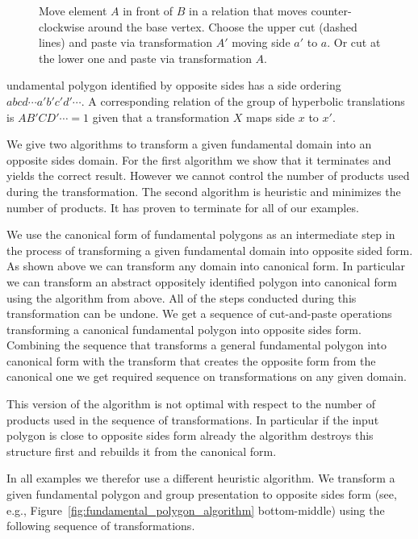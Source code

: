 \documentclass[Thesis]{subfiles}
\begin{document}
\begin{figure}
\centering
\resizebox{0.3\textwidth}{!} {

}
\caption{Move element $A$ in front of $B$ in a relation that moves counter-clockwise around the base vertex. Choose the upper cut (dashed lines) and paste via transformation $A'$ moving side $a'$ to $a$. Or cut at the lower one and paste via transformation $A$.}
\label{fig:cut-and-paste-motion}
\end{figure}

undamental polygon identified by opposite sides has a side ordering $abcd\cdots a'b'c'd'\cdots$. A corresponding relation of the group of hyperbolic translations is $AB'CD'\cdots=1$ given that a transformation $X$ maps side $x$ to $x'$.

We give two algorithms to transform a given fundamental domain into an opposite sides domain.
For the first algorithm we show that it terminates and yields the correct result. However we cannot control the number of products used during the transformation. The second algorithm is heuristic and minimizes the number of products. It has proven to terminate for all of our examples.

We use the canonical form of fundamental polygons as an intermediate step in the process of transforming a given fundamental domain into opposite sided form. As shown above we can transform any domain into canonical form. In particular we can transform an abstract oppositely identified polygon into canonical form using the algorithm from above. All of the steps conducted during this transformation can be undone. We get a sequence of cut-and-paste operations transforming a canonical fundamental polygon into opposite sides form. Combining the sequence that transforms a general fundamental polygon into canonical form with the transform that creates the opposite form from the canonical one we get required sequence on transformations on any given domain.

This version of the algorithm is not optimal with respect to the number of products used in the sequence of transformations. In particular if the input polygon is close to opposite sides form already the algorithm destroys this structure first and rebuilds it from the canonical form.

In all examples we therefor use a different heuristic algorithm. We transform a given fundamental polygon and group presentation to opposite sides form (see, e.g., Figure~\ref{fig:fundamental_polygon_algorithm} bottom-middle) using the following sequence of transformations.
\end{document}

